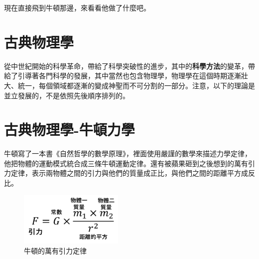 現在直接飛到牛頓那邊，來看看他做了什麼吧。


\section{古典物理學}
從中世紀開始的科學革命，帶給了科學突破性的進步，其中的\textbf{科學方法}的變革，帶給了引導著各門科學的發展，其中當然也包含物理學，物理學在這個時期逐漸壯大、統一，每個領域都逐漸的變成神聖而不可分割的一部分。注意，以下的理論是並立發展的，不是依照先後順序排列的。 
\section{古典物理學-牛頓力學}
牛頓寫了一本書《自然哲學的數學原理》，裡面使用嚴謹的數學來描述力學定律，他把物體的運動模式統合成三條牛頓運動定律。還有被蘋果砸到之後想到的萬有引力定律，表示兩物體之間的引力與他們的質量成正比，與他們之間的距離平方成反比。
\begin{figure}[H]
\centering
\graphicspath{{physics/}}
\includegraphics[width=5cm, center]{newton-law.png}
\caption{牛頓的萬有引力定律}
\label{fig:newton-law}
\end{figure}

